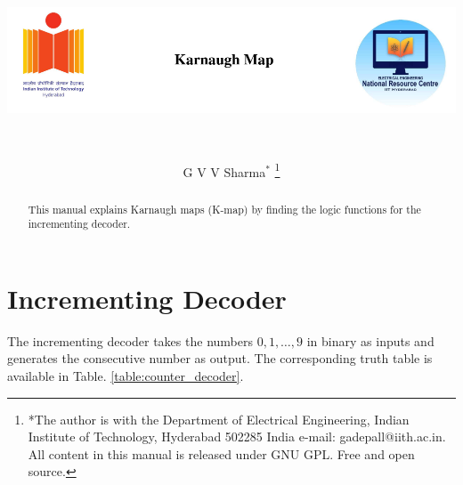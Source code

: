 \documentclass[journal,12pt,twocolumn]{IEEEtran}
\begin{document}
	
	
	\title{
		
		
		\includegraphics[width=15cm, height=4cm]{title}
		\centering
		
	}
	\author{G V V Sharma$^{*}$%
		\thanks{*The author is with the Department
			of Electrical Engineering, Indian Institute of Technology, Hyderabad
			502285 India e-mail:  gadepall@iith.ac.in. All content in this manual is released under GNU GPL.  Free and open source.}}

\maketitle

\tableofcontents

\bigskip

\renewcommand{\thefigure}{\theenumi}
\renewcommand{\thetable}{\theenumi}

\begin{abstract}
This manual explains Karnaugh maps (K-map) by finding the
logic functions for the incrementing decoder.
\end{abstract}

%
\section{Incrementing Decoder}
The incrementing decoder   takes the numbers $0,1,\dots,9$ in binary as inputs and generates
the consecutive number as output.  The corresponding truth table is available in Table. \ref{table:counter_decoder}.
\begin{table}[!h]
	\centering	
	
	\caption{}
	\label{table:counter_decoder}
\end{table}
\end{document}
